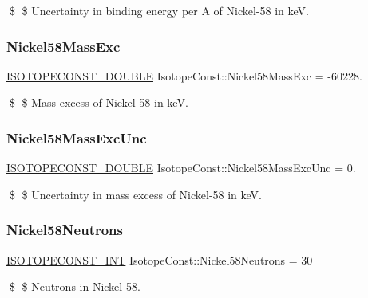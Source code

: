\$ \$ Uncertainty in binding energy per A of Nickel-\/58 in keV. \mbox{\label{group___isotope_const-_nickel-_ni58_ga55e05b3b0e57a32e3518ed9d4d3bdb70}} 
\subsubsection{\texorpdfstring{Nickel58\+Mass\+Exc}{Nickel58MassExc}}
{\footnotesize\ttfamily \mbox{\hyperlink{group___isotope_const-_macros_ga8f45a7272ce02c0b4c65c44636ed719a}{I\+S\+O\+T\+O\+P\+E\+C\+O\+N\+S\+T\+\_\+\+D\+O\+U\+B\+LE}} Isotope\+Const\+::\+Nickel58\+Mass\+Exc = -\/60228.}

\$ \$ Mass excess of Nickel-\/58 in keV. \mbox{\label{group___isotope_const-_nickel-_ni58_ga453003738a81f852db23d91396327bd7}} 
\subsubsection{\texorpdfstring{Nickel58\+Mass\+Exc\+Unc}{Nickel58MassExcUnc}}
{\footnotesize\ttfamily \mbox{\hyperlink{group___isotope_const-_macros_ga8f45a7272ce02c0b4c65c44636ed719a}{I\+S\+O\+T\+O\+P\+E\+C\+O\+N\+S\+T\+\_\+\+D\+O\+U\+B\+LE}} Isotope\+Const\+::\+Nickel58\+Mass\+Exc\+Unc = 0.}

\$ \$ Uncertainty in mass excess of Nickel-\/58 in keV. \mbox{\label{group___isotope_const-_nickel-_ni58_gae79fad7167a48b3796d605c1827bdd97}} 
\subsubsection{\texorpdfstring{Nickel58\+Neutrons}{Nickel58Neutrons}}
{\footnotesize\ttfamily \mbox{\hyperlink{group___isotope_const-_macros_ga5f18360b3e99483a35c32d789e62621c}{I\+S\+O\+T\+O\+P\+E\+C\+O\+N\+S\+T\+\_\+\+I\+NT}} Isotope\+Const\+::\+Nickel58\+Neutrons = 30}

\$ \$ Neutrons in Nickel-\/58. \mbox{\label{group___isotope_const-_nickel-_ni58_ga884e7f4aac7f5bf6746eaee0f7caeaaa}} 
